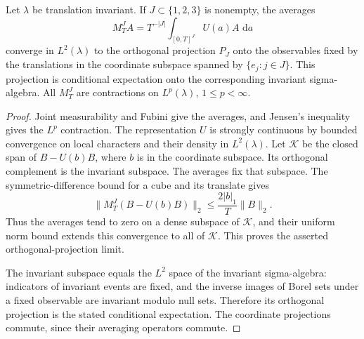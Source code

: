 \documentclass[11pt,letterpaper,reqno]{amsart}
\newcommand{\dd}{\,\mathrm d}
\begin{document}
\begin{lemma}\label{lem:averages-translations}
Let \(\lambda\) be translation invariant. If \(J\subset\{1,2,3\}\)
is nonempty, the averages
\[
 M_T^J A=T^{-|J|}\int_{[0,T]^J}U(a)A\,\dd a
\]
converge in \(L^2(\lambda)\) to the orthogonal projection \(P_J\)
onto the observables fixed by the translations in the coordinate
subspace spanned by \(\{e_j:j\in J\}\).
This projection is conditional expectation onto the corresponding
invariant sigma-algebra. All \(M_T^J\) are contractions on
\(L^p(\lambda)\), \(1\le p<\infty\).
\end{lemma}
\begin{proof}
Joint measurability and Fubini give the averages, and Jensen's
inequality gives the \(L^p\) contraction. The representation \(U\)
is strongly continuous by bounded convergence on local characters
and their density in \(L^2(\lambda)\).
Let \(\mathcal K\) be the closed span of
\(B-U(b)B\), where \(b\) is in the coordinate subspace.
Its orthogonal complement is the invariant subspace.
The averages fix that subspace. The symmetric-difference bound
for a cube and its translate gives
\[
 \|M_T^J(B-U(b)B)\|_2
 \le\frac{2|b|_1}{T}\|B\|_2.
\]
Thus the averages tend to zero on a dense subspace of
\(\mathcal K\), and their uniform norm bound extends this
convergence to all of \(\mathcal K\).
This proves the asserted orthogonal-projection limit.

The invariant subspace equals the \(L^2\) space of the invariant
sigma-algebra: indicators of invariant events are fixed, and
the inverse images of Borel sets under a fixed observable are
invariant modulo null sets. Therefore its orthogonal projection
is the stated conditional expectation. The coordinate projections
commute, since their averaging operators commute.
\end{proof}
\printbibliography
\end{document}
